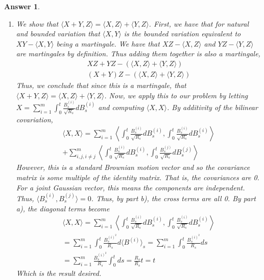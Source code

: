 \documentclass[12pt]{article}
\theoremstyle{colon}
\newtheorem*{answer}{Answer}
\begin{document}
\begin{answer}
\begin{enumerate}[label=\alph*)]
    \item We show that $\langle X + Y, Z \rangle = \langle X, Z \rangle + \langle Y, Z \rangle$. First, we have that for natural and bounded variation that $\langle X, Y \rangle$ is the bounded variation equivalent to $X Y - \langle X, Y \rangle $ being a martingale. We have that $XZ - \langle X, Z \rangle$ and $YZ - \langle Y, Z \rangle$ are martingales by definition. Thus adding them together is also a martingale,
    \begin{gather*}
      XZ + YZ -(\langle X, Z \rangle + \langle Y, Z \rangle) \\
      (X + Y)Z - (\langle X, Z \rangle + \langle Y, Z \rangle)
    \end{gather*}
    Thus, we conclude that since this is a martingale, that $\langle X + Y, Z \rangle = \langle X, Z \rangle + \langle Y, Z \rangle$. Now, we apply this to our problem by letting $X = \sum_{i=1}^m \int_0^t \frac{B_s^{(i)}}{\sqrt{R_s}} d B_s^{(i)}$ and computing $\langle X, X \rangle$. By additivity of the bilinear covariation,
    \begin{gather*}
      \langle X, X \rangle =
      \sum_{i=1}^m \left \langle \int_0^t \frac{B_s^{(i)}}{\sqrt{R_s}} d B_s^{(i)}, \int_0^t \frac{B_s^{(i)}}{\sqrt{R_s}} d B_s^{(i)} \right \rangle \\
      + \sum_{i,j,i \neq j}^m \left \langle \int_0^t \frac{B_s^{(i)}}{\sqrt{R_s}} d B_s^{(i)}, \int_0^t \frac{B_s^{(j)}}{\sqrt{R_s}} d B_s^{(j)} \right \rangle
    \end{gather*}
    However, this is a standard Brownian motion vector and so the covariance matrix is some multiple of the identity matrix. That is, the covariances are 0. For a joint Gaussian vector, this means the components are independent. Thus, $\langle B_s^{(i)}, B_s^{(j)} \rangle = 0$. Thus, by part b), the cross terms are all 0. By part a), the diagonal terms become
    \begin{gather*}
      \langle X, X \rangle = \sum_{i=1}^m \left \langle \int_0^t \frac{B_s^{(i)}}{\sqrt{R_s}} d B_s^{(i)}, \int_0^t \frac{B_s^{(i)}}{\sqrt{R_s}} d B_s^{(i)} \right \rangle \\
      = \sum_{i=1}^m \int_0^t \frac{B_s^{(i)^2}}{R_s} d \langle B^{(i)} \rangle_s = \sum_{i=1}^m \int_0^t \frac{B_s^{(i)^2}}{R_s} d s \\
      = \sum_{i=1}^m \frac{B_s^{(i)^2}}{R_s} \int_0^t ds = \frac{R_s}{R_s} t = t
    \end{gather*}
    Which is the result desired.
  \end{enumerate}
\end{answer}
\end{document}
